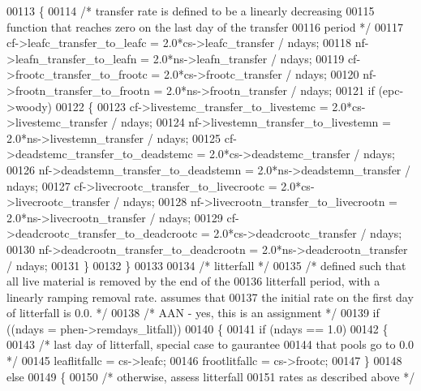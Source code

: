 \begin{DoxyCode}
00113         \{
00114             \textcolor{comment}{/* transfer rate is defined to be a linearly decreasing}
00115 \textcolor{comment}{            function that reaches zero on the last day of the transfer}
00116 \textcolor{comment}{            period */}
00117             cf->leafc\_transfer\_to\_leafc = 2.0*cs->leafc\_transfer / ndays;
00118             nf->leafn\_transfer\_to\_leafn = 2.0*ns->leafn\_transfer / ndays;
00119             cf->frootc\_transfer\_to\_frootc = 2.0*cs->frootc\_transfer / ndays;
00120             nf->frootn\_transfer\_to\_frootn = 2.0*ns->frootn\_transfer / ndays;
00121             \textcolor{keywordflow}{if} (epc->woody)
00122             \{
00123                 cf->livestemc\_transfer\_to\_livestemc = 2.0*cs->livestemc\_transfer / ndays;
00124                 nf->livestemn\_transfer\_to\_livestemn = 2.0*ns->livestemn\_transfer / ndays;
00125                 cf->deadstemc\_transfer\_to\_deadstemc = 2.0*cs->deadstemc\_transfer / ndays;
00126                 nf->deadstemn\_transfer\_to\_deadstemn = 2.0*ns->deadstemn\_transfer / ndays;
00127                 cf->livecrootc\_transfer\_to\_livecrootc = 2.0*cs->livecrootc\_transfer / ndays;
00128                 nf->livecrootn\_transfer\_to\_livecrootn = 2.0*ns->livecrootn\_transfer / ndays;
00129                 cf->deadcrootc\_transfer\_to\_deadcrootc = 2.0*cs->deadcrootc\_transfer / ndays;
00130                 nf->deadcrootn\_transfer\_to\_deadcrootn = 2.0*ns->deadcrootn\_transfer / ndays;
00131             \}
00132         \}
00133         
00134         \textcolor{comment}{/* litterfall */}
00135         \textcolor{comment}{/* defined such that all live material is removed by the end of the}
00136 \textcolor{comment}{        litterfall period, with a linearly ramping removal rate. assumes that}
00137 \textcolor{comment}{        the initial rate on the first day of litterfall is 0.0. */}
00138         \textcolor{comment}{/* AAN - yes, this is an assignment */}
00139         \textcolor{keywordflow}{if} ((ndays = phen->remdays\_litfall))
00140         \{
00141             \textcolor{keywordflow}{if} (ndays == 1.0)
00142             \{
00143                 \textcolor{comment}{/* last day of litterfall, special case to gaurantee}
00144 \textcolor{comment}{                that pools go to 0.0 */}
00145                 leaflitfallc = cs->leafc;
00146                 frootlitfallc = cs->frootc;
00147             \}
00148             \textcolor{keywordflow}{else}
00149             \{
00150                 \textcolor{comment}{/* otherwise, assess litterfall }
00151 \textcolor{comment}{                rates as described above */}

\end{DoxyCode}
